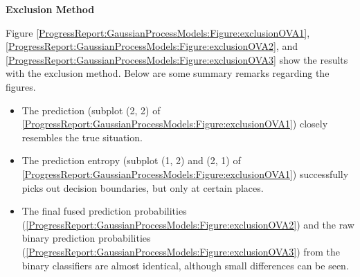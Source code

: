 				\textbf{Exclusion Method}
				
				Figure \ref{ProgressReport:GaussianProcessModels:Figure:exclusionOVA1}, \ref{ProgressReport:GaussianProcessModels:Figure:exclusionOVA2}, and \ref{ProgressReport:GaussianProcessModels:Figure:exclusionOVA3} show the results with the exclusion method. Below are some summary remarks regarding the figures.
				
				\begin{itemize}
					\item The prediction (subplot (2, 2) of \cref{ProgressReport:GaussianProcessModels:Figure:exclusionOVA1}) closely resembles the true situation.
					\item The prediction entropy (subplot (1, 2) and (2, 1) of \cref{ProgressReport:GaussianProcessModels:Figure:exclusionOVA1}) successfully picks out decision boundaries, but only at certain places.
					\item The final fused prediction probabilities (\cref{ProgressReport:GaussianProcessModels:Figure:exclusionOVA2}) and the raw binary prediction probabilities (\cref{ProgressReport:GaussianProcessModels:Figure:exclusionOVA3}) from the binary classifiers are almost identical, although small differences can be seen. 
				\end{itemize}
				

